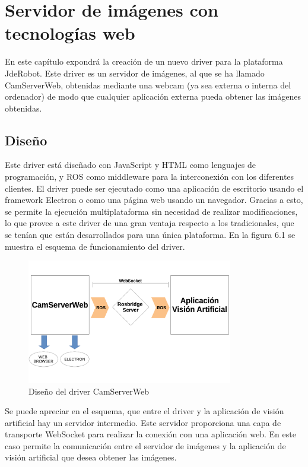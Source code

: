 \chapter{Servidor de imágenes con tecnologías web }\label{cap.camserver}
En este capítulo expondrá la creación de un nuevo driver para la plataforma JdeRobot. Este driver es un servidor de imágenes, al que se ha llamado CamServerWeb, obtenidas mediante una webcam (ya sea externa o interna del ordenador) de modo que cualquier aplicación externa pueda obtener las imágenes obtenidas.
\section{Diseño}
Este driver está diseñado con JavaScript y HTML como lenguajes de programación, y ROS como middleware para la interconexión con los diferentes clientes. El driver puede ser ejecutado como una aplicación de escritorio usando el framework Electron o como una página web usando un navegador. Gracias a esto, se permite la ejecución multiplataforma sin necesidad de realizar modificaciones, lo que provee a este driver de una gran ventaja respecto a los tradicionales, que se tenían que están desarrollados para una única plataforma.  En la figura 6.1 se muestra el esquema de funcionamiento del driver.
\begin{figure}[H]
  \begin{center}
    \includegraphics[width=0.8\textwidth]{figures/cajanegracamserver.png}
		\caption{Diseño del driver CamServerWeb}
		\label{fig.diseñocamserver}
		\end{center}
\end{figure}

Se puede apreciar en el esquema, que entre el driver y la aplicación de visión artificial hay un servidor intermedio. Este servidor proporciona una capa de transporte WebSocket para realizar la conexión con una aplicación web. En este caso permite la comunicación entre el servidor de imágenes y la aplicación de visión artificial que desea obtener las imágenes.

